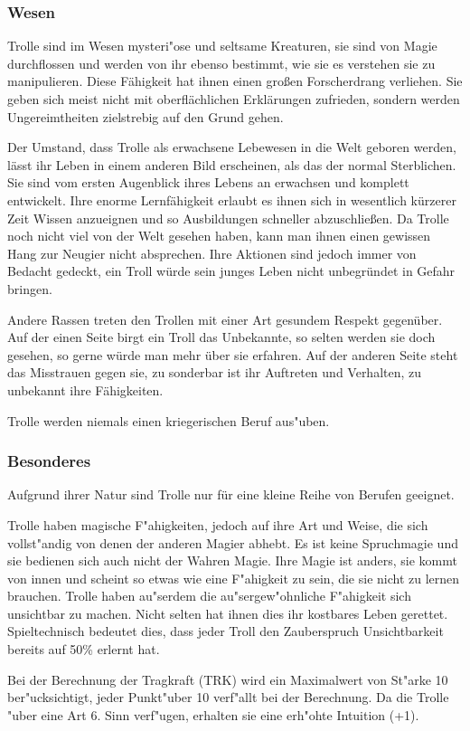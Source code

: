 \subsubsection{Wesen}
\par Trolle sind im Wesen mysteri"ose und seltsame Kreaturen,
sie sind von Magie durchflossen und werden von ihr ebenso bestimmt,
wie sie es verstehen sie zu manipulieren. Diese Fähigkeit hat ihnen
einen großen Forscherdrang verliehen. Sie geben sich meist nicht mit
oberflächlichen Erklärungen zufrieden, sondern werden
Ungereimtheiten zielstrebig auf den Grund gehen.
\par Der Umstand, dass Trolle als erwachsene Lebewesen in die Welt
geboren werden, lässt ihr Leben in einem anderen Bild erscheinen,
als das der normal Sterblichen. Sie sind vom ersten Augenblick ihres
Lebens an erwachsen und komplett entwickelt. Ihre enorme
Lernfähigkeit erlaubt es ihnen sich in wesentlich kürzerer Zeit
Wissen anzueignen und so Ausbildungen schneller abzuschließen. Da
Trolle noch nicht viel von der Welt gesehen haben, kann man ihnen
einen gewissen Hang zur Neugier nicht absprechen. Ihre Aktionen sind
jedoch immer von Bedacht gedeckt, ein Troll würde sein junges Leben
nicht unbegründet in Gefahr bringen.
\par Andere Rassen treten den Trollen mit einer Art gesundem Respekt
gegenüber. Auf der einen Seite birgt ein Troll das Unbekannte, so
selten werden sie doch gesehen, so gerne würde man mehr über sie
erfahren. Auf der anderen Seite steht das Misstrauen gegen sie, zu
sonderbar ist ihr Auftreten und Verhalten, zu unbekannt ihre
Fähigkeiten.
\par Trolle werden niemals einen kriegerischen Beruf aus"uben.
\subsubsection{Besonderes}
\par Aufgrund ihrer Natur sind Trolle nur für eine kleine Reihe von
Berufen geeignet.
\par Trolle haben magische F"ahigkeiten,
jedoch auf ihre Art und Weise, die sich vollst"andig von denen der
anderen Magier abhebt. Es ist keine Spruchmagie und sie bedienen
sich auch nicht der \glqq Wahren Magie\grqq. Ihre Magie ist anders,
sie kommt von innen und scheint so etwas wie eine F"ahigkeit zu
sein, die sie nicht zu lernen brauchen. Trolle haben au"serdem die
au"sergew"ohnliche F"ahigkeit sich unsichtbar zu machen. Nicht
selten hat ihnen dies ihr kostbares Leben gerettet. Spieltechnisch
bedeutet dies, dass jeder Troll den Zauberspruch Unsichtbarkeit bereits
auf 50\% erlernt hat.
\par Bei der Berechnung der Tragkraft (TRK) wird
ein Maximalwert von St"arke 10 ber"ucksichtigt, jeder Punkt"uber 10
verf"allt bei der Berechnung. Da die Trolle "uber eine Art 6. Sinn
verf"ugen, erhalten sie eine erh"ohte Intuition (+1).